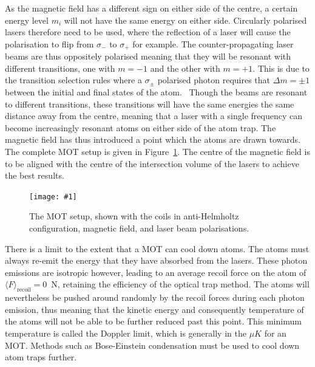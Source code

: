\documentclass[twocolumn]{article}
\newcommand{\insertFigure}[1]{%
   \texttt{[image: \#1]}%
}
\begin{document}
As the magnetic field has a different sign on either side of the centre, a certain energy level $m_i$ will not have the same energy on either side. Circularly polarised lasers therefore need to be used, where the reflection of a laser will cause the polarisation to flip from $\sigma_-$ to $\sigma_+$ for example. The counter-propagating laser beams are thus oppositely polarised meaning that they will be resonant with different transitions, one with $m=-1$ and the other with $m=+1$. This is due to the transition selection rules where a $\sigma_\pm$ polarised photon requires that $\Delta m=\pm1$ between the initial and final states of the atom.~\cite{Foot} Though the beams are resonant to different transitions, these transitions will have the same energies the same distance away from the centre, meaning that a laser with a single frequency can become increasingly resonant atoms on either side of the atom trap. The magnetic field has thus introduced a point which the atoms are drawn towards. The complete MOT setup is given in Figure~\ref{fig:MOT2}. The centre of the magnetic field is to be aligned with the centre of the intersection volume of the lasers to achieve the best results. \\
\begin{figure} [!h]
	\centering
	\insertFigure{Images/MOT2.png}
	\caption{The MOT setup, shown with the coils in anti-Helmholtz configuration, magnetic field, and laser beam polarisations.~\cite{Foot}}
	\label{fig:MOT2}
\end{figure}
 
\par There is a limit to the extent that a MOT can cool down atoms. The atoms must always re-emit the energy that they have absorbed from the lasers. These photon emissions are isotropic however, leading to an average recoil force on the atom of $\langle F\rangle_{\text{recoil}}=0$~N, retaining the efficiency of the optical trap method. The atoms will nevertheless be pushed around randomly by the recoil forces during each photon emission, thus meaning that the kinetic energy and consequently temperature of the atoms will not be able to be further reduced past this point. This minimum temperature is called the Doppler limit, which is generally in the $\mu K$ for an MOT. Methods such as Bose-Einstein condensation must be used to cool down atom traps further. 
\end{document}
